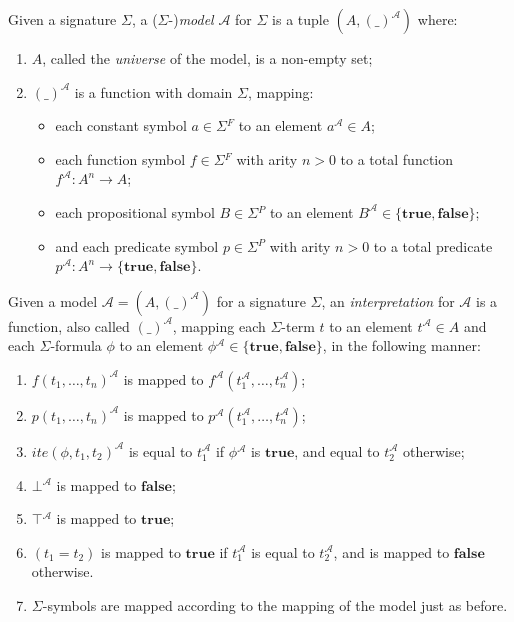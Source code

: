 \begin{definition}[Model]
  Given a signature $\Sigma{}$, a ($\Sigma{}$-)\textit{model} $\mathcal{A}$ for
  $\Sigma{}$ is a tuple $(A, (\_)^{\mathcal{A}})$ where:
  \begin{enumerate}
  \item $A$, called the \textit{universe} of the model, is a non-empty set;
  \item $(\_)^{\mathcal{A}}$ is a function with domain $\Sigma{}$, mapping:
    \begin{itemize}
    \item each constant symbol $a \in \Sigma{}^F$ to an element
      $a^{\mathcal{A}} \in A$;
    \item each function symbol $f \in \Sigma{}^F$ with arity $n > 0$ to a total
      function $f^{\mathcal{A}}\colon A^n \to A$;
    \item each propositional symbol $B \in \Sigma{}^P$ to an element
      $B^{\mathcal{A}} \in \{\mathbf{true}, \mathbf{false}\}$;
    \item and each predicate symbol $p \in \Sigma{}^P$ with arity $n > 0$ to a
      total predicate $p^{\mathcal{A}}\colon A^n \to \{\mathbf{true},
      \mathbf{false}\}$.
    \end{itemize}
  \end{enumerate}
\end{definition}

\begin{definition}[Interpretation]
  Given a model $\mathcal{A} = (A, (\_)^{\mathcal{A}})$ for a signature
  $\Sigma{}$, an \textit{interpretation} for $\mathcal{A}$ is a function, also
  called $(\_)^{\mathcal{A}}$, mapping each $\Sigma{}$-term $t$ to an element
  $t^{\mathcal{A}}\in A$ and each $\Sigma{}$-formula $\phi{}$ to an element
  $\phi{}^{\mathcal{A}}\in \{\mathbf{true}, \mathbf{false}\}$, in the following
  manner:
  \begin{enumerate}
  \item $f(t_1,\ldots,t_n)^{\mathcal{A}}$ is mapped to
    $f^{\mathcal{A}}(t_1^{\mathcal{A}},\ldots,t_n^{\mathcal{A}})$;
  \item $p(t_1,\ldots,t_n)^{\mathcal{A}}$ is mapped to
    $p^{\mathcal{A}}(t_1^{\mathcal{A}},\ldots,t_n^{\mathcal{A}})$;
  \item $ite(\phi{}, t_1, t_2)^{\mathcal{A}}$ is equal to $t_1^{\mathcal{A}}$ if
    $\phi{}^{\mathcal{A}}$ is $\mathbf{true}$, and equal to $t_2^{\mathcal{A}}$
    otherwise;
  \item $\bot{}^{\mathcal{A}}$ is mapped to $\mathbf{false}$;
  \item $\top{}^{\mathcal{A}}$ is mapped to $\mathbf{true}$;
  \item $(t_1 = t_2)$ is mapped to $\mathbf{true}$ if
    $t_1^{\mathcal{A}}$ is equal to $ t_2^{\mathcal{A}}$, and is mapped to
    $\mathbf{false}$ otherwise.
  \item $\Sigma$-symbols are mapped according to the mapping of the model just
    as before.
  \end{enumerate}
\end{definition}

